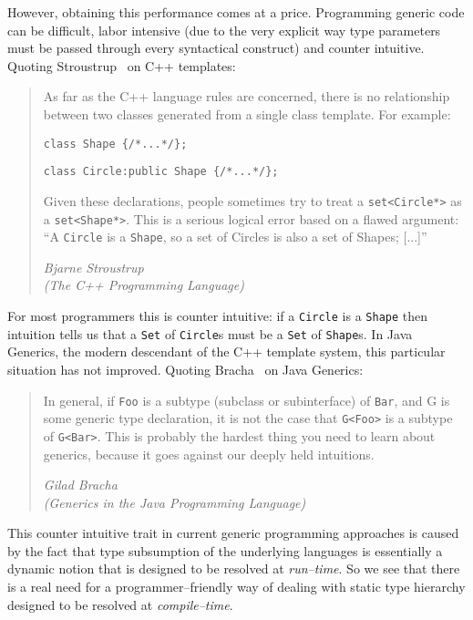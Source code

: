 \documentclass{sigplanconf}
\begin{document}
However, obtaining this performance comes at a price. Programming
generic code can be difficult, labor intensive (due to the very
explicit way type parameters must be passed through every syntactical
construct) and counter intuitive. Quoting
Stroustrup~\cite{Stroustrup2000} on C++ templates:
\begin{quote}
  As far as the C++ language rules are concerned, there is no
  relationship between two classes generated from a single class
  template. For example:

  \verb+class Shape {/*...*/};+
  
  \verb+class Circle:public Shape {/*...*/};+

  Given these declarations, people sometimes try to treat a
  \verb+set<Circle*>+ as a \verb+set<Shape*>+. This is a serious
  logical error based on a flawed argument: ``A \verb+Circle+ is a
  \verb+Shape+, so a set of Circles is also a set of Shapes; [...]''

  \emph{Bjarne Stroustrup\\(The C++ Programming
    Language)}
\end{quote}

For most programmers this is counter intuitive: if a \verb+Circle+ is a
\verb+Shape+ then intuition tells us that a \verb+Set+ of
\verb+Circle+s must be a \verb+Set+ of \verb+Shape+s.
In Java Generics, the modern descendant of the C++ template system,
this particular situation has not improved. Quoting
Bracha~\cite{Bracha2004} on Java Generics:
\begin{quote}
  In general, if \verb+Foo+ is a subtype (subclass or subinterface) of
  \verb+Bar+, and G is some generic type declaration, it is not the
  case that \verb+G<Foo>+ is a subtype of \verb+G<Bar>+. This is
  probably the hardest thing you need to learn about generics, because
  it goes against our deeply held intuitions.

  \emph{Gilad Bracha\\(Generics in the Java Programming Language)}
\end{quote}

This counter intuitive trait in current generic programming approaches
is caused by the fact that type subsumption of the underlying
languages is essentially a dynamic notion that is designed to be
resolved at \emph{run--time}. So we see that there is a real need for
a programmer--friendly way of dealing with static type hierarchy
designed to be resolved at \emph{compile--time}.
\end{document}
